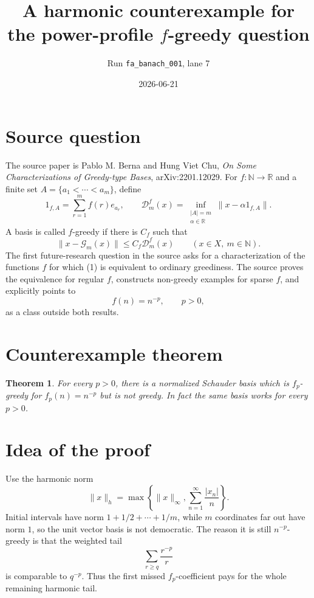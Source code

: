 \documentclass[11pt]{article}
\title{A harmonic counterexample for the power-profile \(f\)-greedy question}
\author{Run \texttt{fa\_banach\_001}, lane 7}
\date{2026-06-21}
\newtheorem{theorem}{Theorem}
\theoremstyle{definition}
\newcommand{\N}{\mathbb N}
\newcommand{\calD}{\mathcal D}
\newcommand{\calG}{\mathcal G}
\begin{document}
\maketitle

\section*{Source question}

The source paper is Pablo M. Berna and Hung Viet Chu,
\emph{On Some Characterizations of Greedy-type Bases}, arXiv:2201.12029.
For \(f:\N\to\mathbb R\) and a finite set
\(A=\{a_1<\cdots<a_m\}\), define
\[
        1_{f,A}=\sum_{r=1}^m f(r)e_{a_r},
        \qquad
        \calD_m^f(x)=
        \inf_{\substack{|A|=m\\ \alpha\in\mathbb R}}
        \|x-\alpha 1_{f,A}\|.
\]
A basis is called \(f\)-greedy if there is \(C_f\) such that
\[
        \|x-\calG_m(x)\|\le C_f \calD_m^f(x)
        \qquad (x\in X,\ m\in\N).
        \tag{1}
\]
The first future-research question in the source asks for a characterization
of the functions \(f\) for which (1) is equivalent to ordinary greediness.
The source proves the equivalence for regular \(f\), constructs non-greedy
examples for sparse \(f\), and explicitly points to
\[
        f(n)=n^{-p},\qquad p>0,
\]
as a class outside both results.

\section*{Counterexample theorem}

\begin{theorem}\label{thm:counterexample}
For every \(p>0\), there is a normalized Schauder basis which is
\(f_p\)-greedy for \(f_p(n)=n^{-p}\) but is not greedy.  In fact the same
basis works for every \(p>0\).
\end{theorem}

\section*{Idea of the proof}

Use the harmonic norm
\[
        \|x\|_h=\max\left\{\|x\|_\infty,\sum_{n=1}^\infty \frac{|x_n|}{n}\right\}.
\]
Initial intervals have norm \(1+1/2+\cdots+1/m\), while \(m\) coordinates far
out have norm \(1\), so the unit vector basis is not democratic.  The reason
it is still \(n^{-p}\)-greedy is that the weighted tail
\[
        \sum_{r\ge q}\frac{r^{-p}}{r}
\]
is comparable to \(q^{-p}\).  Thus the first missed \(f_p\)-coefficient pays
for the whole remaining harmonic tail.
\end{document}
